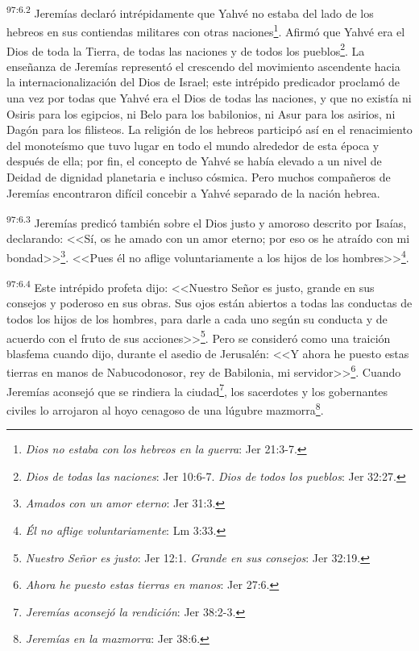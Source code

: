 \par
\textsuperscript{97:6.2} Jeremías declaró intrépidamente que Yahvé no estaba del lado de los hebreos en sus contiendas militares con otras naciones\footnote{\textit{Dios no estaba con los hebreos en la guerra}: Jer 21:3-7.}. Afirmó que Yahvé era el Dios de toda la Tierra, de todas las naciones y de todos los pueblos\footnote{\textit{Dios de todas las naciones}: Jer 10:6-7. \textit{Dios de todos los pueblos}: Jer 32:27.}. La enseñanza de Jeremías representó el crescendo del movimiento ascendente hacia la internacionalización del Dios de Israel; este intrépido predicador proclamó de una vez por todas que Yahvé era el Dios de todas las naciones, y que no existía ni Osiris para los egipcios, ni Belo para los babilonios, ni Asur para los asirios, ni Dagón para los filisteos. La religión de los hebreos participó así en el renacimiento del monoteísmo que tuvo lugar en todo el mundo alrededor de esta época y después de ella; por fin, el concepto de Yahvé se había elevado a un nivel de Deidad de dignidad planetaria e incluso cósmica. Pero muchos compañeros de Jeremías encontraron difícil concebir a Yahvé separado de la nación hebrea.

\par
\textsuperscript{97:6.3} Jeremías predicó también sobre el Dios justo y amoroso descrito por Isaías, declarando: <<Sí, os he amado con un amor eterno; por eso os he atraído con mi bondad>>\footnote{\textit{Amados con un amor eterno}: Jer 31:3.}. <<Pues él no aflige voluntariamente a los hijos de los hombres>>\footnote{\textit{Él no aflige voluntariamente}: Lm 3:33.}.

\par
\textsuperscript{97:6.4} Este intrépido profeta dijo: <<Nuestro Señor es justo, grande en sus consejos y poderoso en sus obras. Sus ojos están abiertos a todas las conductas de todos los hijos de los hombres, para darle a cada uno según su conducta y de acuerdo con el fruto de sus acciones>>\footnote{\textit{Nuestro Señor es justo}: Jer 12:1. \textit{Grande en sus consejos}: Jer 32:19.}. Pero se consideró como una traición blasfema cuando dijo, durante el asedio de Jerusalén: <<Y ahora he puesto estas tierras en manos de Nabucodonosor, rey de Babilonia, mi servidor>>\footnote{\textit{Ahora he puesto estas tierras en manos}: Jer 27:6.}. Cuando Jeremías aconsejó que se rindiera la ciudad\footnote{\textit{Jeremías aconsejó la rendición}: Jer 38:2-3.}, los sacerdotes y los gobernantes civiles lo arrojaron al hoyo cenagoso de una lúgubre mazmorra\footnote{\textit{Jeremías en la mazmorra}: Jer 38:6.}.

